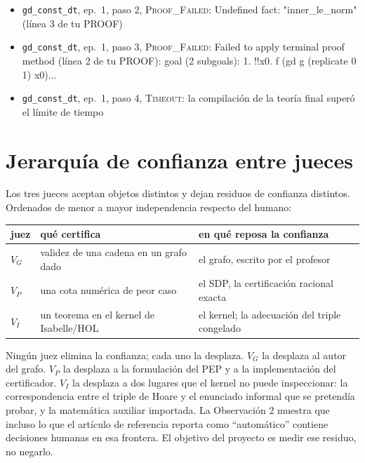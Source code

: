 \documentclass[11pt,a4paper]{article}
\begin{document}
{\begin{itemize}
  \item \texttt{gd\_\allowbreak{}const\_\allowbreak{}dt}, ep.~1, paso 2, \textsc{Proof\_Failed}: Undefined fact: "inner\_le\_norm" (línea 3 de tu PROOF)
  \item \texttt{gd\_\allowbreak{}const\_\allowbreak{}dt}, ep.~1, paso 3, \textsc{Proof\_Failed}: Failed to apply terminal proof method (línea 2 de tu PROOF): goal (2 subgoals): 1. !{}!x0. f (gd g (replicate 0 1) x0)...
  \item \texttt{gd\_\allowbreak{}const\_\allowbreak{}dt}, ep.~1, paso 4, \textsc{Timeout}: la compilación de la teoría final superó el límite de tiempo
\end{itemize}
\par}

\section{Jerarquía de confianza entre jueces}

Los tres jueces aceptan objetos distintos y dejan residuos de confianza distintos. Ordenados de menor a mayor independencia respecto del humano:

\begin{center}
\begin{tabular}{@{}lll@{}}
\toprule
juez & qué certifica & en qué reposa la confianza \\
\midrule
$V_G$ & validez de una cadena en un grafo dado & el grafo, escrito por el profesor \\
$V_P$ & una cota numérica de peor caso & el SDP, la certificación racional exacta \\
$V_I$ & un teorema en el kernel de Isabelle/HOL & el kernel; la adecuación del triple congelado \\
\bottomrule
\end{tabular}
\end{center}

Ningún juez elimina la confianza; cada uno la desplaza. $V_G$ la desplaza al autor del grafo. $V_P$ la desplaza a la formulación del PEP y a la implementación del certificador. $V_I$ la desplaza a dos lugares que el kernel no puede inspeccionar: la correspondencia entre el triple de Hoare y el enunciado informal que se pretendía probar, y la matemática auxiliar importada. La Observación 2 muestra que incluso lo que el artículo de referencia reporta como ``automático'' contiene decisiones humanas en esa frontera. El objetivo del proyecto es medir ese residuo, no negarlo.
\end{document}
